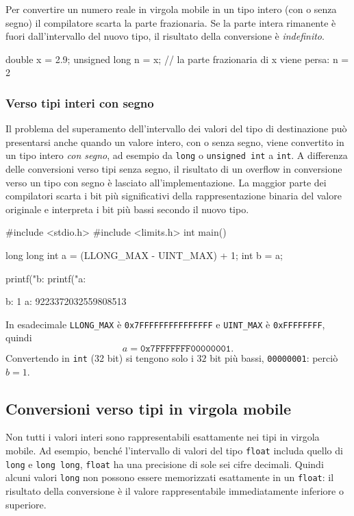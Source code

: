 \documentclass[11pt,a4paper]{article}
\begin{document}
Per convertire un numero reale in virgola mobile in un tipo intero (con o senza segno) il compilatore scarta la parte frazionaria. Se la parte intera rimanente è fuori dall'intervallo del nuovo tipo, il risultato della conversione è \emph{indefinito}.

\begin{codice}
double x = 2.9;
unsigned long n = x;   // la parte frazionaria di x viene persa: n = 2
\end{codice}

\subsubsection{Verso tipi interi con segno}

Il problema del superamento dell'intervallo dei valori del tipo di destinazione può presentarsi anche quando un valore intero, con o senza segno, viene convertito in un tipo intero \emph{con segno}, ad esempio da \lstinline|long| o \lstinline|unsigned int| a \lstinline|int|. A differenza delle conversioni verso tipi senza segno, il risultato di un overflow in conversione verso un tipo con segno è lasciato all'implementazione. La maggior parte dei compilatori scarta i bit più significativi della rappresentazione binaria del valore originale e interpreta i bit più bassi secondo il nuovo tipo.

\begin{esempio}
\begin{codice}
#include <stdio.h>
#include <limits.h>
int main() {
    long long int a = (LLONG_MAX - UINT_MAX) + 1;
    int b = a;

    printf("b: %
    printf("a: %
}
\end{codice}
\begin{risultato}
b: 1
a: 9223372032559808513
\end{risultato}
In esadecimale \lstinline|LLONG_MAX| è \texttt{0x7FFFFFFFFFFFFFFF} e \lstinline|UINT_MAX| è \texttt{0xFFFFFFFF}, quindi
\[
a = \texttt{0x7FFFFFFF00000001}.
\]
Convertendo in \lstinline|int| (32 bit) si tengono solo i $32$ bit più bassi, \texttt{00000001}: perciò $b = 1$.
\end{esempio}

\subsection{Conversioni verso tipi in virgola mobile}

Non tutti i valori interi sono rappresentabili esattamente nei tipi in virgola mobile. Ad esempio, benché l'intervallo di valori del tipo \lstinline|float| includa quello di \lstinline|long| e \lstinline|long long|, \lstinline|float| ha una precisione di sole sei cifre decimali. Quindi alcuni valori \lstinline|long| non possono essere memorizzati esattamente in un \lstinline|float|: il risultato della conversione è il valore rappresentabile immediatamente inferiore o superiore.
\end{document}
